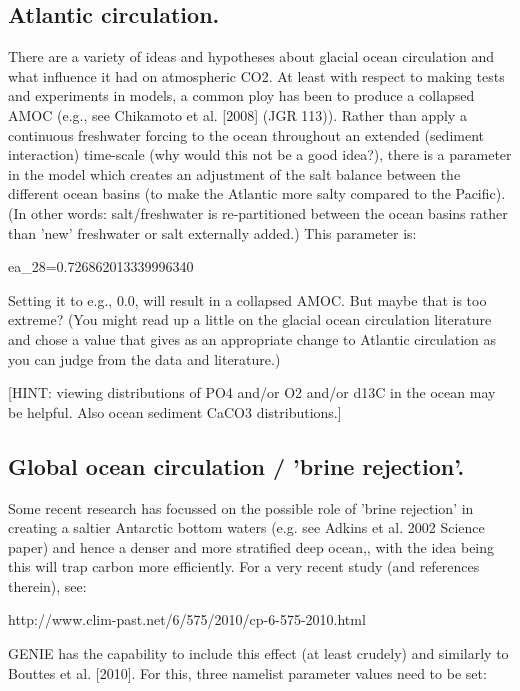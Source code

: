 \documentclass[11pt,fleqn]{book} %
\begin{document}
%
\subsection{Atlantic circulation.}

There are a variety of ideas and hypotheses about glacial ocean
circulation and what influence it had on atmospheric CO2. At least with respect to making
tests and experiments in models, a common ploy has been to produce a collapsed AMOC
(e.g., see Chikamoto et al. [2008] (JGR 113)). Rather than apply a continuous freshwater
forcing to the ocean throughout an extended (sediment interaction) time-scale (why would
this not be a good idea?), there is a parameter in the model which creates an adjustment of
the salt balance between the different ocean basins (to make the Atlantic more salty
compared to the Pacific). (In other words: salt/freshwater is re-partitioned between the
ocean basins rather than 'new' freshwater or salt externally added.) This parameter is:

ea\_28=0.726862013339996340

Setting it to e.g., 0.0, will result in a collapsed AMOC. But maybe that is too extreme? (You
might read up a little on the glacial ocean circulation literature and chose a value that gives
as an appropriate change to Atlantic circulation as you can judge from the data and
literature.)

[HINT: viewing distributions of PO4 and/or O2 and/or d13C in the ocean may be helpful. Also
ocean sediment CaCO3 distributions.]

%
\subsection{Global ocean circulation / 'brine rejection'.}

Some recent research has focussed on the
possible role of 'brine rejection' in creating a saltier Antarctic bottom waters (e.g. see Adkins
et al. 2002 Science paper) and hence a denser and more stratified deep ocean,, with the
idea being this will trap carbon more efficiently. For a very recent study (and references
therein), see:

http://www.clim-past.net/6/575/2010/cp-6-575-2010.html

GENIE has the capability to include this effect (at least crudely) and similarly to Bouttes et
al. [2010]. For this, three namelist parameter values need to be set:
\end{document}
